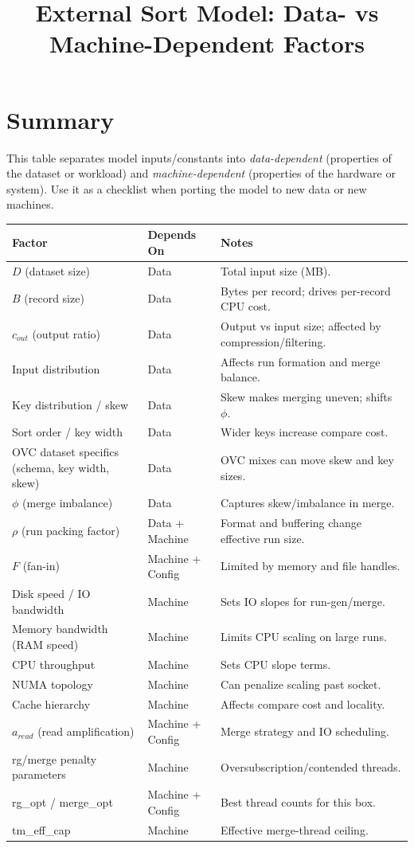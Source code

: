 \documentclass[11pt]{article}
\title{External Sort Model: Data- vs Machine-Dependent Factors}
\author{}
\date{}
\begin{document}
\maketitle

\section*{Summary}
This table separates model inputs/constants into \emph{data-dependent} (properties of the dataset or workload) and \emph{machine-dependent} (properties of the hardware or system). Use it as a checklist when porting the model to new data or new machines.

\begin{center}
\begin{tabular}{p{} p{} p{}}
\toprule
Factor & Depends On & Notes \\
\midrule
$D$ (dataset size) & Data & Total input size (MB). \\
$B$ (record size) & Data & Bytes per record; drives per-record CPU cost. \\
$c_{out}$ (output ratio) & Data & Output vs input size; affected by compression/filtering. \\
Input distribution & Data & Affects run formation and merge balance. \\
Key distribution / skew & Data & Skew makes merging uneven; shifts $\phi$. \\
Sort order / key width & Data & Wider keys increase compare cost. \\
OVC dataset specifics (schema, key width, skew) & Data & OVC mixes can move skew and key sizes. \\
$\phi$ (merge imbalance) & Data & Captures skew/imbalance in merge. \\
$\rho$ (run packing factor) & Data + Machine & Format and buffering change effective run size. \\
$F$ (fan-in) & Machine + Config & Limited by memory and file handles. \\
\midrule
Disk speed / IO bandwidth & Machine & Sets IO slopes for run-gen/merge. \\
Memory bandwidth (RAM speed) & Machine & Limits CPU scaling on large runs. \\
CPU throughput & Machine & Sets CPU slope terms. \\
NUMA topology & Machine & Can penalize scaling past socket. \\
Cache hierarchy & Machine & Affects compare cost and locality. \\
$a_{read}$ (read amplification) & Machine + Config & Merge strategy and IO scheduling. \\
rg/merge penalty parameters & Machine & Oversubscription/contended threads. \\
rg\_opt / merge\_opt & Machine + Config & Best thread counts for this box. \\
tm\_eff\_cap & Machine & Effective merge-thread ceiling. \\
\bottomrule
\end{tabular}
\end{center}
\end{document}
